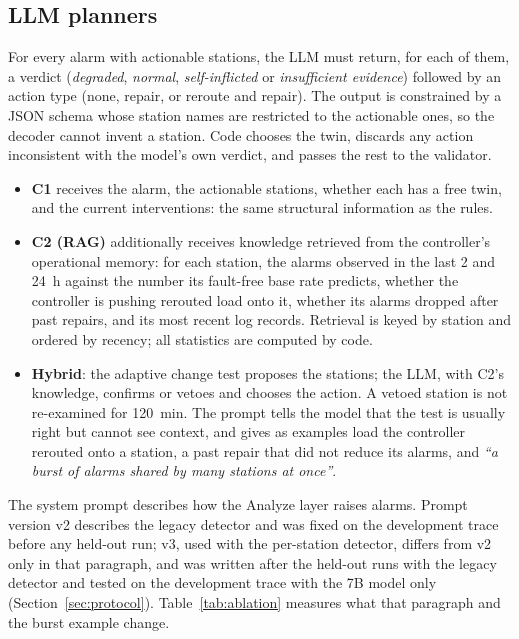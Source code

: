 \documentclass[preprint,11pt]{elsarticle}
\begin{document}
\subsection{LLM planners}
For every alarm with actionable stations, the LLM must return, for each of them, a verdict (\emph{degraded}, \emph{normal}, \emph{self-inflicted} or \emph{insufficient evidence}) followed by an action type (none, repair, or reroute and repair). The output is constrained by a JSON schema whose station names are restricted to the actionable ones, so the decoder cannot invent a station. Code chooses the twin, discards any action inconsistent with the model's own verdict, and passes the rest to the validator.
\begin{itemize}
  \item \textbf{C1} receives the alarm, the actionable stations, whether each has a free twin, and the current interventions: the same structural information as the rules.
  \item \textbf{C2 (RAG)} additionally receives knowledge retrieved from the controller's operational memory: for each station, the alarms observed in the last 2 and 24~h against the number its fault-free base rate predicts, whether the controller is pushing rerouted load onto it, whether its alarms dropped after past repairs, and its most recent log records. Retrieval is keyed by station and ordered by recency; all statistics are computed by code.
  \item \textbf{Hybrid}: the adaptive change test proposes the stations; the LLM, with C2's knowledge, confirms or vetoes and chooses the action. A vetoed station is not re-examined for 120~min. The prompt tells the model that the test is usually right but cannot see context, and gives as examples load the controller rerouted onto a station, a past repair that did not reduce its alarms, and \emph{``a burst of alarms shared by many stations at once''}.
\end{itemize}
The system prompt describes how the Analyze layer raises alarms. Prompt version v2 describes the legacy detector and was fixed on the development trace before any held-out run; v3, used with the per-station detector, differs from v2 only in that paragraph, and was written after the held-out runs with the legacy detector and tested on the development trace with the 7B model only (Section~\ref{sec:protocol}). Table~\ref{tab:ablation} measures what that paragraph and the burst example change.
\end{document}
